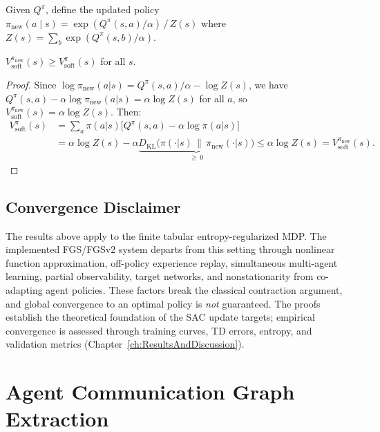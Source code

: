 Given $Q^\pi$, define the updated policy $\pi_{\mathrm{new}}(a\mid s) = \exp(Q^\pi(s,a)/\alpha)\,/\,Z(s)$ where $Z(s)=\sum_b\exp(Q^\pi(s,b)/\alpha)$.

\begin{proposition}
$V^{\pi_{\mathrm{new}}}_{\mathrm{soft}}(s) \geq V^\pi_{\mathrm{soft}}(s)$ for all $s$.
\end{proposition}
\begin{proof}
Since $\log\pi_{\mathrm{new}}(a|s) = Q^\pi(s,a)/\alpha - \log Z(s)$, we have $Q^\pi(s,a)-\alpha\log\pi_{\mathrm{new}}(a|s)=\alpha\log Z(s)$ for all $a$, so $V^{\pi_{\mathrm{new}}}_{\mathrm{soft}}(s)=\alpha\log Z(s)$. Then:
\begin{align*}
  V^\pi_{\mathrm{soft}}(s)
  &= \sum_a\pi(a|s)\bigl[Q^\pi(s,a)-\alpha\log\pi(a|s)\bigr] \\
  &= \alpha\log Z(s)
     - \alpha\underbrace{D_{\mathrm{KL}}\!\bigl(\pi(\cdot|s)\,\|\,\pi_{\mathrm{new}}(\cdot|s)\bigr)}_{\geq\,0}
   \leq \alpha\log Z(s)
   = V^{\pi_{\mathrm{new}}}_{\mathrm{soft}}(s).
\end{align*}
\end{proof}

\subsection{Convergence Disclaimer}
\label{sec:Appendix_convergence_disclaimer}

The results above apply to the finite tabular entropy-regularized MDP. The implemented FGS/FGSv2 system departs from this setting through nonlinear function approximation, off-policy experience replay, simultaneous multi-agent learning, partial observability, target networks, and nonstationarity from co-adapting agent policies. These factors break the classical contraction argument, and global convergence to an optimal policy is \emph{not} guaranteed. The proofs establish the theoretical foundation of the SAC update targets; empirical convergence is assessed through training curves, TD errors, entropy, and validation metrics (Chapter~\ref{ch:ResultsAndDiscussion}).

\section{Agent Communication Graph Extraction}
\label{sec:Appendix_TLSGraphExtraction}

